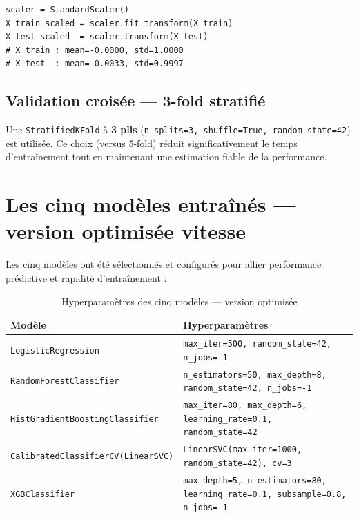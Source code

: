\documentclass[12pt,a4paper,oneside]{report}
\newcommand{\code}[1]{\texttt{\small #1}}
\begin{document}
\begin{lstlisting}[caption={Normalisation pour le ML — Étape 2}]
scaler = StandardScaler()
X_train_scaled = scaler.fit_transform(X_train)
X_test_scaled  = scaler.transform(X_test)
# X_train : mean=-0.0000, std=1.0000
# X_test  : mean=-0.0033, std=0.9997
\end{lstlisting}

\subsection{Validation croisée — 3-fold stratifié}

Une \code{StratifiedKFold} à \textbf{3 plis} (\code{n\_splits=3, shuffle=True, random\_state=42}) est utilisée. Ce choix (versus 5-fold) réduit significativement le temps d'entraînement tout en maintenant une estimation fiable de la performance.

\section{Les cinq modèles entraînés — version optimisée vitesse}

Les cinq modèles ont été sélectionnés et configurés pour allier performance prédictive et rapidité d'entraînement :

\begin{table}[H]
  \centering
  \caption{Hyperparamètres des cinq modèles — version optimisée}
  \label{tab:hyperparams}
  \begin{tabularx}{\textwidth}{lX}
    \toprule
    \textbf{Modèle} & \textbf{Hyperparamètres} \\
    \midrule
    \code{LogisticRegression}   & \code{max\_iter=500, random\_state=42, n\_jobs=-1} \\
    \code{RandomForestClassifier}      & \code{n\_estimators=50, max\_depth=8, random\_state=42, n\_jobs=-1} \\
    \code{HistGradientBoostingClassifier}  & \code{max\_iter=80, max\_depth=6, learning\_rate=0.1, random\_state=42} \\
    \code{CalibratedClassifierCV(LinearSVC)} & \code{LinearSVC(max\_iter=1000, random\_state=42), cv=3} \\
    \code{XGBClassifier}        & \code{max\_depth=5, n\_estimators=80, learning\_rate=0.1, subsample=0.8, n\_jobs=-1} \\
    \bottomrule
  \end{tabularx}
\end{table}
\end{document}
